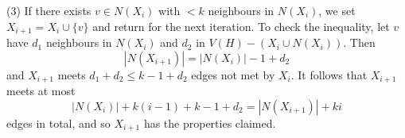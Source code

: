 \hspace*{12pt}(3) If there exists $v \in N(X_i)$ with $< k$ neighbours in $N(X_i)$, we set $X_{i+1} = X_i \cup \{v\}$ and return for the next iteration. To check the inequality, let $v$ have $d_1$ neighbours in $N(X_i)$ and $d_2$ in $V(H) - (X_i \cup N(X_i))$. Then
\begin{equation*}
|N(X_{i+1})| = |N(X_i)| - 1 + d_2
\end{equation*}
and $X_{i+1}$ meets $d_1 + d_2 \le k - 1 + d_2$ edges not met by $X_i$. It follows that $X_{i+1}$ meets at most
\begin{equation*}
|N(X_i)| + k(i - 1) + k - 1 + d_2 = |N(X_{i+1})| + ki
\end{equation*}
edges in total, and so $X_{i+1}$ has the properties claimed.
